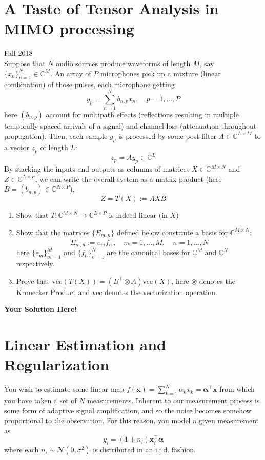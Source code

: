 \documentclass[12pt]{article}
\newcommand{\x}{\mathbf{x}}
\newcommand{\0}{\mathbf{0}}
\newcommand{\1}{\mathbf{1}}
\newcommand{\solspace}{\vspace{3mm} \textbf{Your Solution Here!} \vspace{3mm}}
\begin{document}
\section{A Taste of Tensor Analysis in MIMO processing}
Fall 2018\\
Suppose that $N$ audio sources produce waveforms of length $M$, say $\{x_n\}_{n=1}^{N} \in \mathbb{C}^M$.
An array of $P$ microphones pick up a mixture (linear combination) of those pulses, each microphone getting
$$
y_p = \sum_{n=1}^N b_{n,p}x_n, \quad p = 1, ..., P
$$
here $(b_{n,p})$ account for multipath effects (reflections resulting in multiple temporally spaced arrivals of a signal) and channel loss (attenuation throughout propagation).
Then, each sample $y_p$ is processed by some post-filter $A \in \mathbb{C}^{L \times M}$ to a vector $z_p$ of length $L$:
$$
    z_p = Ay_p \in \mathbb{C}^L
$$
By stacking the inputs and outputs as columns of matrices $X \in \mathbb{C}^{M \times N}$ and $Z \in \mathbb{C}^{L \times P}$, we can write the overall system as a matrix product (here $B = (b_{n,p}) \in \mathbb{C}^{N \times P}$),
\begin{equation}
    Z = T(X) := AXB
\end{equation}
\begin{enumerate}
    \item Show that $T : \mathbb{C}^{M \times N} \rightarrow \mathbb{C}^{L \times P}$ is indeed linear (in $X$)
    \item Show that the matrices $\{E_{m,n}\}$ defined below constitute a basis for $\mathbb{C}^{M \times N}$:
        \begin{equation}
            E_{m,n} := e_m f_n^\top, \quad m = 1,...,M, \quad n = 1,...,N
        \end{equation}
        here $\{e_m\}_{m=1}^M$ and $\{f_n\}_{n=1}^N$ are the canonical bases for $\mathbb{C}^M$ and $\mathbb{C}^N$ respectively.
    \item Prove that $\text{vec}(T(X)) = (B^\top \otimes A)\text{vec}(X)$, here $\otimes$ denotes the \href{https://en.wikipedia.org/wiki/Kronecker_product}{Kronecker Product} and \href{https://en.wikipedia.org/wiki/Vectorization_(mathematics)}{vec} denotes the vectorization operation.
\end{enumerate}

\solspace

\pagebreak

\section{Linear Estimation and Regularization}
You wish to estimate some linear map $f(\x) = \sum_{k=1}^N \alpha_k x_k = \bm \alpha^\top \x$ from which you have taken a set of $N$ measurements.
Inherent to our measurement process is some form of adaptive signal amplification, and so the noise becomes somehow proportional to the observation.
For this reason, you model a given measurement as
\begin{equation}
    y_i = (1 + n_i)\x_i^\top \bm \alpha
\end{equation}
where each $n_i \sim \mathcal{N}(0,\sigma^2)$ is distributed in an i.i.d. fashion.
\end{document}
